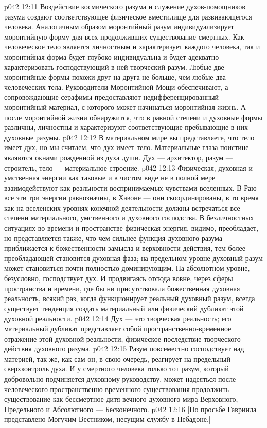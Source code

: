 \vs p042 12:11 Воздействие космического разума и служение духов\hyp{}помощников разума создают соответствующее физическое вместилище для развивающегося человека. Аналогичным образом моронтийный разум индивидуализирует моронтийную форму для всех продолживших существование смертных. Как человеческое тело является личностным и характеризует каждого человека, так и моронтийная форма будет глубоко индивидуальна и будет адекватно характеризовать господствующий в ней творческий разум. Любые две моронтийные формы похожи друг на друга не больше, чем любые два человеческих тела. Руководители Моронтийной Мощи обеспечивают, а сопровождающие серафимы предоставляют недифференцированный моронтийный материал, с которого может начинаться моронтийная жизнь. А после моронтийной жизни обнаружится, что в равной степени и духовные формы различны, личностны и характеризуют соответствующие пребывающие в них духовные разумы.
\vs p042 12:12 \pc В материальном мире вы представляете, что тело имеет дух, но мы считаем, что дух имеет тело. Материальные глаза поистине являются окнами рожденной из духа души. Дух --- архитектор, разум --- строитель, тело --- материальное строение.
\vs p042 12:13 \pc Физическая, духовная и умственная энергии как таковые и в чистом виде не в полной мере взаимодействуют как реальности воспринимаемых чувствами вселенных. В Раю все эти три энергии равнозначны, в Хавоне --- они скоординированы, в то время как на вселенских уровнях конечной деятельности должны встречаться все степени материального, умственного и духовного господства. В безличностных ситуациях во времени и пространстве физическая энергия, видимо, преобладает, но представляется также, что чем сильнее функция духовного разума приближается к божественности замысла и верховности действия, тем более преобладающей становится духовная фаза; на предельном уровне духовный разум может становиться почти полностью доминирующим. На абсолютном уровне, безусловно, господствует дух. И продвигаясь отсюда вовне, через сферы пространства и времени, где бы ни присутствовала божественная духовная реальность, всякий раз, когда функционирует реальный духовный разум, всегда существует тенденция создать материальный или физический дубликат этой духовной реальности.
\vs p042 12:14 Дух --- это творческая реальность; его материальный дубликат представляет собой пространственно\hyp{}временное отражение этой духовной реальности, физическое последствие творческого действия духовного разума.
\vs p042 12:15 Разум повсеместно господствует над материей, так же, как сам он, в свою очередь, реагирует на предельный сверхконтроль духа. И у смертного человека только тот разум, который добровольно подчиняется духовному руководству, может надеяться после человеческого пространственно\hyp{}временного существования продолжить существование как бессмертное дитя вечного духовного мира Верховного, Предельного и Абсолютного --- Бесконечного.
\vsetoff
\vs p042 12:16 [По просьбе Гавриила представлено Могучим Вестником, несущим службу в Небадоне.]
